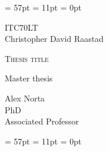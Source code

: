 \documentclass[12pt]{article} %
\begin{document}
\thispagestyle{fancy} %
\renewcommand{\headrulewidth}{0pt} %
\renewcommand{\footrulewidth}{0pt} %
\headheight = 57pt %
\footskip = 11pt %
\headsep = 0pt %

\vspace*{7 cm} %

\begin{center} %
ITC70LT\\[0cm]
Christopher David Raastad\\
\begin{LARGE}
\textsc{Thesis title\\}  
\end{LARGE}
Master thesis\\[2cm]
\end{center}

\begin{flushright} %
Alex Norta\\[0cm]
PhD\\[0cm]
Associated Professor\\[0cm]
\end{flushright}

\pagebreak %

\thispagestyle{fancy} %
\renewcommand{\headrulewidth}{0pt} %
\renewcommand{\footrulewidth}{0pt} %
\headheight = 57pt %
\footskip = 11pt %
\headsep = 0pt %
\end{document}
